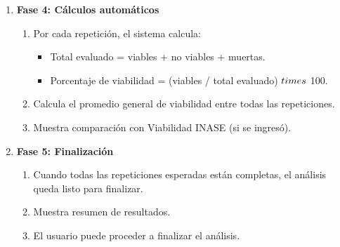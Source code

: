 \begin{enumerate}[nosep]
    \item \textbf{Fase 4: Cálculos automáticos}
    \begin{enumerate}[nosep]
        \item Por cada repetición, el sistema calcula:
        \begin{itemize}[nosep]
            \item Total evaluado = viables + no viables + muertas.
            \item Porcentaje de viabilidad = (viables / total evaluado) $\\times$ 100.
        \end{itemize}
        \item Calcula el promedio general de viabilidad entre todas las repeticiones.
        \item Muestra comparación con Viabilidad INASE (si se ingresó).
    \end{enumerate}

    \item \textbf{Fase 5: Finalización}
    \begin{enumerate}[nosep]
        \item Cuando todas las repeticiones esperadas están completas, el análisis queda listo para finalizar.
        \item Muestra resumen de resultados.
        \item El usuario puede proceder a finalizar el análisis.
    \end{enumerate}
\end{enumerate}

